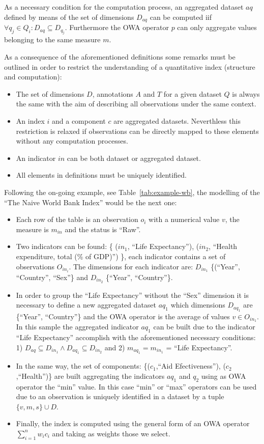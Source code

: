 As a necessary condition for the computation process, an aggregated dataset $aq$ defined by means of the set of dimensions $D_{aq}$ can be computed iif 
$\forall q_j \in Q_i: D_{aq} \subseteq D_{q_j}$. Furthermore the OWA operator $p$ can only aggregate values belonging to the same measure $m$.


As a consequence of the aforementioned definitions some remarks must be outlined in order to restrict the understanding of 
a quantitative index (structure and computation):
\begin{itemize}
 \item The set of dimensions $D$, annotations $A$ and $T$ for a given dataset $Q$ is always the same with the aim of describing all observations under 
 the same context.
 \item An index $i$ and a component $c$ are aggregated datasets. Neverthless this restriction is relaxed if observations can be directly mapped to 
 these elements without any computation processes.
 \item An indicator $in$ can be both dataset or aggregated dataset.
 \item All elements in definitions must be uniquely identified. 
\end{itemize}

Following the on-going example, see Table~\ref{tab:example-wb}, the modelling of the ``The Naive World Bank Index'' would be the next one:
\begin{itemize}
 \item Each row of the table is an observation $o_i$ with a numerical value $v$, the measure is $m_{in}$ and the status is ``Raw''.
 \item Two indicators can be found: \{ ($in_1$, ``Life Expectancy''), ($in_2$, ``Health expenditure, total (\% of GDP)'') \}, each indicator contains a set 
 of observations $O_{in_i}$. The dimensions for each indicator are: $D_{in_1}$  \{(``Year'', ``Country'', ``Sex''\} and $D_{in_2}$ \{``Year'', ``Country''\}.
 \item In order to group the ``Life Expectancy'' without the ``Sex'' dimension it is necessary to define a new aggregated dataset $aq_1$ which 
 dimensions $D_{aq_1}$ are \{``Year'', ``Country''\} and the OWA operator is the average of values $v \in O_{in_1}$. In this sample the aggregated indicator $aq_1$
 can be built due to the indicator ``Life Expectancy'' accomplish with the aforementioned necessary conditions: 1) $D_{aq} \subseteq D_{in_1} \wedge D_{aq_1} \subseteq D_{in_2}$ and 
 2) $m_{aq_1}= m_{in_1}$ = ``Life Expectancy''.
 \item In the same way, the set of components: \{($c_1$,``Aid Efectiveness''), ($c_2$,``Health'')\} are built aggregating the indicators $aq_1$ and 
 $q_2$ using as OWA operator the ``min'' value. In this case ``min'' or ``max'' operators can be used due to an observation is uniquely identified in a 
 dataset by a tuple $\{v,m,s\} \cup D$.
 \item Finally, the index is computed using the general form of an OWA operator $\sum_{i=1}^n  w_i c_i$ and taking as weights those we select.
\end{itemize}

